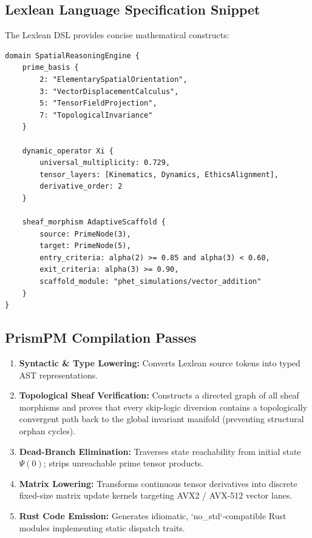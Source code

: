 \subsection{Lexlean Language Specification Snippet}
The Lexlean DSL provides concise mathematical constructs:

\begin{lstlisting}[language=Lexlean, caption={Lexlean Domain Declaration for Skip-Logic State Engine}]
domain SpatialReasoningEngine {
    prime_basis {
        2: "ElementarySpatialOrientation",
        3: "VectorDisplacementCalculus",
        5: "TensorFieldProjection",
        7: "TopologicalInvariance"
    }

    dynamic_operator Xi {
        universal_multiplicity: 0.729,
        tensor_layers: [Kinematics, Dynamics, EthicsAlignment],
        derivative_order: 2
    }

    sheaf_morphism AdaptiveScaffold {
        source: PrimeNode(3),
        target: PrimeNode(5),
        entry_criteria: alpha(2) >= 0.85 and alpha(3) < 0.60,
        exit_criteria: alpha(3) >= 0.90,
        scaffold_module: "phet_simulations/vector_addition"
    }
}
\end{lstlisting}

\subsection{PrismPM Compilation Passes}
\begin{enumerate}
    \item \textbf{Syntactic \& Type Lowering:} Converts Lexlean source tokens into typed AST representations.
    \item \textbf{Topological Sheaf Verification:} Constructs a directed graph of all sheaf morphisms and proves that every skip-logic diversion contains a topologically convergent path back to the global invariant manifold (preventing structural orphan cycles).
    \item \textbf{Dead-Branch Elimination:} Traverses state reachability from initial state $\Psi(0)$; strips unreachable prime tensor products.
    \item \textbf{Matrix Lowering:} Transforms continuous tensor derivatives into discrete fixed-size matrix update kernels targeting AVX2 / AVX-512 vector lanes.
    \item \textbf{Rust Code Emission:} Generates idiomatic, `no_std`-compatible Rust modules implementing static dispatch traits.
\end{enumerate}

